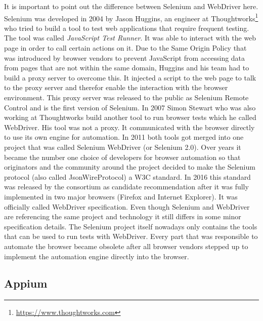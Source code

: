 It is important to point out the difference between Selenium and WebDriver here. Selenium was developed in 2004 by Jason Huggins, an engineer at Thoughtworks\footnote{\url{https://www.thoughtworks.com}} who tried to build a tool to test web applications that require frequent testing. The tool was called \textit{JavaScript Test Runner}. It was able to interact with the web page in order to call certain actions on it. Due to the Same Origin Policy that was introduced by browser vendors to prevent JavaScript from accessing data from pages that are not within the same domain, Huggins and his team had to build a proxy server to overcome this. It injected a script to the web page to talk to the proxy server and therefor enable the interaction with the browser environment. This proxy server was released to the public as Selenium Remote Control and is the first version of Selenium. In 2007 Simon Stewart who was also working at Thoughtworks build another tool to run browser tests which he called WebDriver. His tool was not a proxy. It communicated with the browser directly to use its own engine for automation. In 2011 both tools got merged into one project that was called Selenium WebDriver (or Selenium 2.0). Over years it became the number one choice of developers for browser automation so that originators and the community around the project decided to make the Selenium protocol (also called JsonWireProtocol) a W3C standard. In 2016 this standard was released by the consortium as candidate recommendation after it was fully implemented in two major browsers (Firefox and Internet Explorer). It was officially called WebDriver specification. Even though Selenium and WebDriver are referencing the same project and technology it still differs in some minor specification details. The Selenium project itself nowadays only contains the tools that can be used to run tests with WebDriver. Every part that was responsible to automate the browser became obsolete after all browser vendors stepped up to implement the automation engine directly into the browser.

\subsection{Appium\label{sec:appium}}

